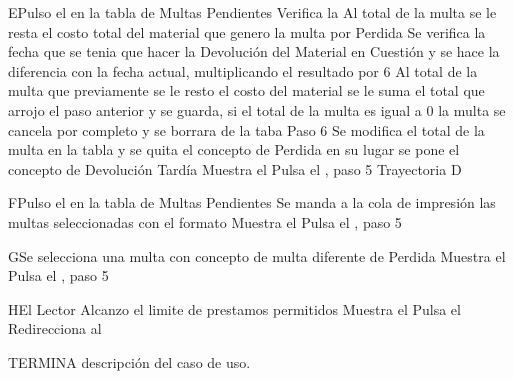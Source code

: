 		\begin{UCtrayectoriaA}{E}{Pulso el  en la tabla de Multas Pendientes}
			\UCpaso[\UCsist] Verifica la 
			\UCpaso[\UCsist] Al total de la multa se le resta el costo total del material que genero la multa por Perdida
			\UCpaso[\UCsist] Se verifica la fecha que se tenia que hacer la Devolución del Material en Cuestión y se hace la diferencia con la fecha actual, multiplicando el resultado por 6
			\UCpaso[\UCsist] Al total de la multa que previamente se le resto el costo del material se le suma el total que arrojo el paso anterior y se guarda, si el total de la multa es igual a 0 la multa se cancela por completo y se borrara de la taba Paso 6 \Trayref[E]
			\UCpaso[\UCsist] Se modifica el total de la multa en la tabla y se quita el concepto de Perdida en su lugar se pone el concepto de Devolución Tardía
			\UCpaso[\UCsist] Muestra el 
			\UCpaso[\UCactor] Pulsa el , paso 5 Trayectoria D
		\end{UCtrayectoriaA}
		\begin{UCtrayectoriaA}{F}{Pulso el  en la tabla de Multas Pendientes}
			\UCpaso[\UCsist] Se manda a la cola de impresión las multas seleccionadas con el formato 
			\UCpaso[\UCsist] Muestra el 
			\UCpaso[\UCactor] Pulsa el , paso 5 
		\end{UCtrayectoriaA}
		\begin{UCtrayectoriaA}{G}{Se selecciona una multa con concepto de multa diferente de Perdida}
			\UCpaso[\UCsist] Muestra el 
			\UCpaso[\UCactor] Pulsa el , paso 5 
		\end{UCtrayectoriaA}
		\begin{UCtrayectoriaA}{H}{El Lector Alcanzo el limite de prestamos permitidos}
			\UCpaso[\UCsist] Muestra el 
			\UCpaso[\UCactor] Pulsa el 
			\UCpaso[\UCsist] Redirecciona al 
		\end{UCtrayectoriaA}
		
TERMINA descripción del caso de uso.
